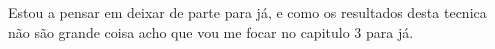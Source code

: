 \subsubsection{}
\label{subsubsec:CLFs_Unified_Algorithm}

Estou a pensar em deixar de parte para já, e como os resultados desta tecnica não são grande coisa acho que vou me focar no capitulo 3 para já.
































\endinput





































   

